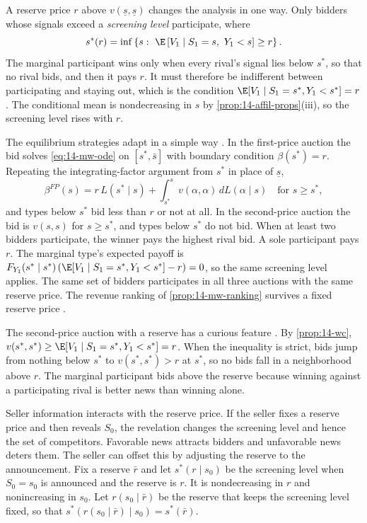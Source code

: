 A reserve price $r$ above $v(\underline s,\underline s)$ changes the analysis in one way. Only bidders whose
signals exceed a \emph{screening level} participate, where \citep[eq.~(10)]{MilgromWeber1982}
\begin{equation}\label{eq:14-mw-screen}
  s^*(r)=\inf\left\{s:\ \E\left[V_1\mid S_1=s,\ Y_1<s\right]\ge r\right\}.
\end{equation}
The marginal participant wins only when every rival's signal lies below $s^*$, so that no rival bids, and then
it pays $r$. It must therefore be indifferent between participating and staying out, which is the condition
$\E[V_1\mid S_1=s^*,Y_1<s^*]=r$. The conditional mean is nondecreasing in $s$ by
\cref{prop:14-affil-props}(iii), so the screening level rises with $r$.

The equilibrium strategies adapt in a simple way \citep[p.~1111]{MilgromWeber1982}. In the first-price
auction the bid solves \eqref{eq:14-mw-ode} on $[s^*,\bar s]$ with boundary condition $\beta(s^*)=r$. Repeating
the integrating-factor argument from $s^*$ in place of $\underline s$,
\begin{equation*}
  \beta^{FP}(s)=r\,L(s^*\mid s)+\int_{s^*}^sv(\alpha,\alpha)\,dL(\alpha\mid s)\quad\text{for }s\ge s^*,
\end{equation*}
and types below $s^*$ bid less than $r$ or not at all. In the second-price auction the bid is $v(s,s)$ for
$s\ge s^*$, and types below $s^*$ do not bid. When at least two bidders participate, the winner pays the
highest rival bid. A sole participant pays $r$. The marginal type's expected payoff is
$F_{Y_1}(s^*\mid s^*)\left(\E[V_1\mid S_1=s^*,Y_1<s^*]-r\right)=0$, so the same screening level
applies. The same set of bidders participates in all three auctions with the same reserve price. The revenue
ranking of \cref{prop:14-mw-ranking} survives a fixed reserve price \citep[p.~1112]{MilgromWeber1982}.

The second-price auction with a reserve has a curious feature \citep[footnote~26]{MilgromWeber1982}. By
\cref{prop:14-wc}, $v(s^*,s^*)\ge\E[V_1\mid S_1=s^*,Y_1<s^*]=r$. When the inequality is strict, bids jump from
nothing below $s^*$ to $v(s^*,s^*)>r$ at $s^*$, so no bids fall in a neighborhood above $r$. The marginal
participant bids above the reserve because winning against a participating rival is better news than winning
alone.

Seller information interacts with the reserve price. If the seller fixes a reserve price and then reveals
$S_0$, the revelation changes the screening level and hence the set of competitors. Favorable news attracts
bidders and unfavorable news deters them. The seller can offset this by adjusting the reserve to the
announcement. Fix a reserve $\bar r$ and let $s^*(r\mid s_0)$ be the screening level when $S_0=s_0$ is
announced and the reserve is $r$. It is nondecreasing in $r$ and nonincreasing in $s_0$. Let $r(s_0\mid\bar r)$
be the reserve that keeps the screening level fixed, so that $s^*(r(s_0\mid\bar r)\mid s_0)=s^*(\bar r)$.

